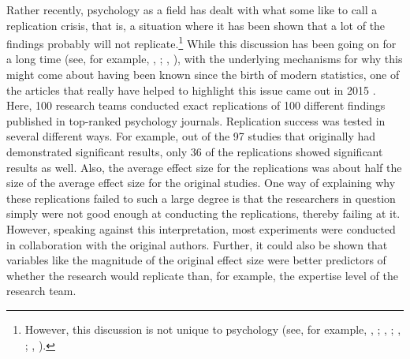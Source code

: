 Rather recently, psychology as a field has dealt with what some like to call a replication crisis, that is, a situation where it has been shown that a lot of the findings probably will not replicate.\footnote{However, this discussion is not unique to psychology (see, for example, \citeauthor{Baker2016}, \citeyear{Baker2016}; \citeauthor{Begley2012}, \citeyear{Begley2012}; \citeauthor{Camerer2016}, \citeyear{Camerer2016}; \citeauthor{Ioannidis2005b}, \citeyear{Ioannidis2005b}).} While this discussion has been going on for a long time (see, for example, \citeauthor{Francis2012}, \citeyear{Francis2012}; \citeauthor{Ioannidis2005}, \citeyear{Ioannidis2005}), with the underlying mechanisms for why this might come about having been known since the birth of modern statistics, one of the articles that really have helped to highlight this issue came out in 2015 \parencite{Openscience2015}. Here, 100 research teams conducted exact replications of 100 different findings published in top-ranked psychology journals. Replication success was tested in several different ways. For example, out of the 97 studies that originally had demonstrated significant results, only 36 of the replications showed significant results as well. Also, the average effect size for the replications was about half the size of the average effect size for the original studies. One way of explaining why these replications failed to such a large degree is that the researchers in question simply were not good enough at conducting the replications, thereby failing at it. However, speaking against this interpretation, most experiments were conducted in collaboration with the original authors. Further, it could also be shown that variables like the magnitude of the original effect size were better predictors of whether the research would replicate than, for example, the expertise level of the research team.

